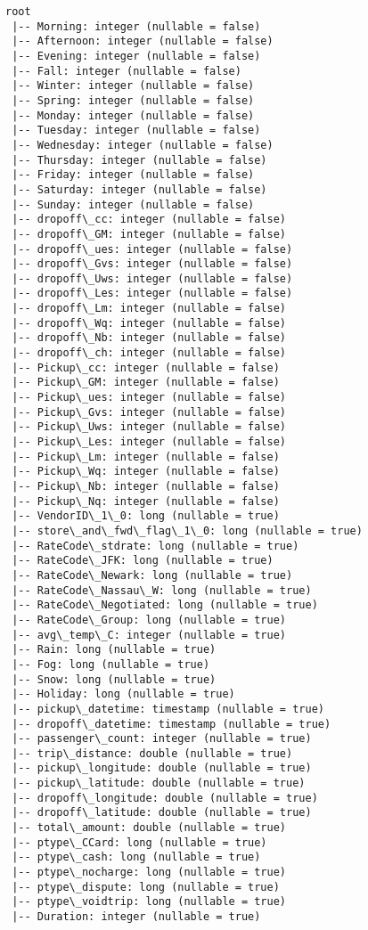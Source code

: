 \documentclass[11pt]{article}
\begin{document}
    \begin{Verbatim}[commandchars=\\\{\}]
root
 |-- Morning: integer (nullable = false)
 |-- Afternoon: integer (nullable = false)
 |-- Evening: integer (nullable = false)
 |-- Fall: integer (nullable = false)
 |-- Winter: integer (nullable = false)
 |-- Spring: integer (nullable = false)
 |-- Monday: integer (nullable = false)
 |-- Tuesday: integer (nullable = false)
 |-- Wednesday: integer (nullable = false)
 |-- Thursday: integer (nullable = false)
 |-- Friday: integer (nullable = false)
 |-- Saturday: integer (nullable = false)
 |-- Sunday: integer (nullable = false)
 |-- dropoff\_cc: integer (nullable = false)
 |-- dropoff\_GM: integer (nullable = false)
 |-- dropoff\_ues: integer (nullable = false)
 |-- dropoff\_Gvs: integer (nullable = false)
 |-- dropoff\_Uws: integer (nullable = false)
 |-- dropoff\_Les: integer (nullable = false)
 |-- dropoff\_Lm: integer (nullable = false)
 |-- dropoff\_Wq: integer (nullable = false)
 |-- dropoff\_Nb: integer (nullable = false)
 |-- dropoff\_ch: integer (nullable = false)
 |-- Pickup\_cc: integer (nullable = false)
 |-- Pickup\_GM: integer (nullable = false)
 |-- Pickup\_ues: integer (nullable = false)
 |-- Pickup\_Gvs: integer (nullable = false)
 |-- Pickup\_Uws: integer (nullable = false)
 |-- Pickup\_Les: integer (nullable = false)
 |-- Pickup\_Lm: integer (nullable = false)
 |-- Pickup\_Wq: integer (nullable = false)
 |-- Pickup\_Nb: integer (nullable = false)
 |-- Pickup\_Nq: integer (nullable = false)
 |-- VendorID\_1\_0: long (nullable = true)
 |-- store\_and\_fwd\_flag\_1\_0: long (nullable = true)
 |-- RateCode\_stdrate: long (nullable = true)
 |-- RateCode\_JFK: long (nullable = true)
 |-- RateCode\_Newark: long (nullable = true)
 |-- RateCode\_Nassau\_W: long (nullable = true)
 |-- RateCode\_Negotiated: long (nullable = true)
 |-- RateCode\_Group: long (nullable = true)
 |-- avg\_temp\_C: integer (nullable = true)
 |-- Rain: long (nullable = true)
 |-- Fog: long (nullable = true)
 |-- Snow: long (nullable = true)
 |-- Holiday: long (nullable = true)
 |-- pickup\_datetime: timestamp (nullable = true)
 |-- dropoff\_datetime: timestamp (nullable = true)
 |-- passenger\_count: integer (nullable = true)
 |-- trip\_distance: double (nullable = true)
 |-- pickup\_longitude: double (nullable = true)
 |-- pickup\_latitude: double (nullable = true)
 |-- dropoff\_longitude: double (nullable = true)
 |-- dropoff\_latitude: double (nullable = true)
 |-- total\_amount: double (nullable = true)
 |-- ptype\_CCard: long (nullable = true)
 |-- ptype\_cash: long (nullable = true)
 |-- ptype\_nocharge: long (nullable = true)
 |-- ptype\_dispute: long (nullable = true)
 |-- ptype\_voidtrip: long (nullable = true)
 |-- Duration: integer (nullable = true)


    \end{Verbatim}
\end{document}
